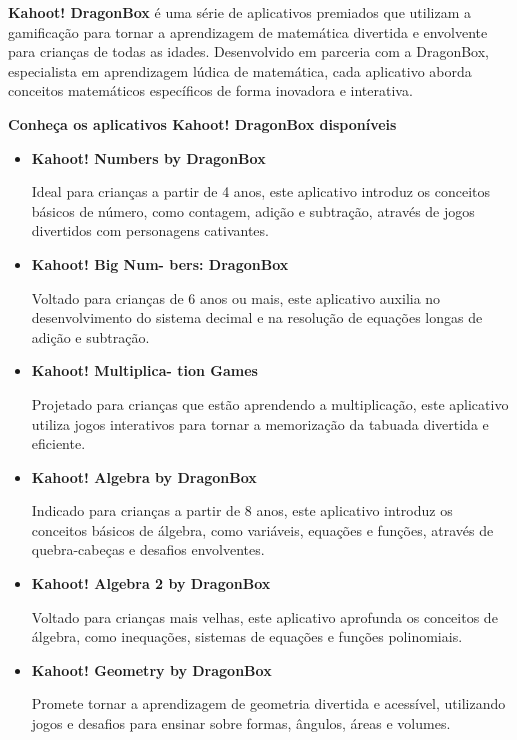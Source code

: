 \textbf{Kahoot! DragonBox} é uma série de aplicativos premiados que utilizam a gamificação para tornar a aprendizagem de matemática divertida e envolvente para crianças de todas as idades. Desenvolvido em parceria com a DragonBox, especialista em aprendizagem lúdica de matemática, cada aplicativo aborda conceitos matemáticos específicos de forma inovadora e interativa.

\item \textbf{Conheça os aplicativos Kahoot! DragonBox disponíveis}


\begin{itemize}
    \item \textbf{Kahoot! Numbers by
DragonBox}

Ideal para crianças a partir de 4 anos, este aplicativo introduz os conceitos básicos de número, como contagem, adição e subtração, através de jogos divertidos com personagens cativantes.

    \item \textbf{Kahoot! Big Num-
bers: DragonBox}

Voltado para crianças de 6 anos ou mais, este aplicativo auxilia no desenvolvimento do sistema decimal e na resolução de equações longas de adição e subtração.

    \item \textbf{Kahoot! Multiplica-
tion Games}

Projetado para crianças que estão aprendendo a multiplicação, este aplicativo utiliza jogos interativos para tornar a memorização da tabuada divertida e eficiente.

    \item \textbf{Kahoot! Algebra by
DragonBox}

Indicado para crianças a partir de 8 anos, este aplicativo introduz os conceitos básicos de álgebra, como variáveis, equações e funções, através de quebra-cabeças e desafios envolventes.

\item \textbf{Kahoot! Algebra 2 by
DragonBox}

Voltado para crianças mais velhas, este aplicativo aprofunda os conceitos de álgebra, como inequações, sistemas de equações e funções polinomiais.

\item \textbf{Kahoot! Geometry
by DragonBox}

Promete tornar a aprendizagem de geometria divertida e acessível, utilizando jogos e desafios para ensinar sobre formas, ângulos, áreas e volumes.

    \end{itemize}


